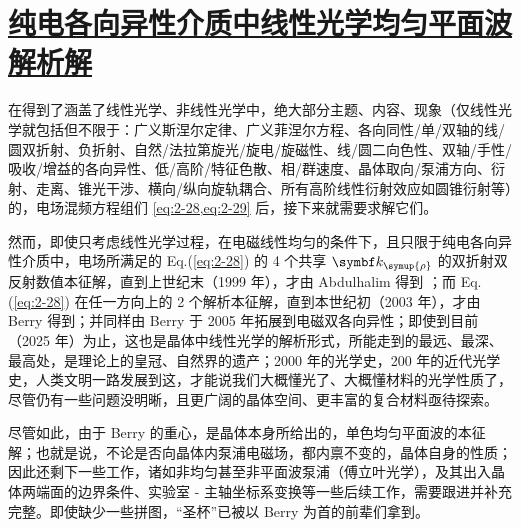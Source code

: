 \section{\protect\hyperlink{chap:\thesection}{纯电各向异性介质中线性光学均匀平面波解析解}}
\label{纯电各向异性介质中线性光学均匀平面波解析解}

在得到了涵盖了线性光学、非线性光学中，绝大部分主题、内容、现象（仅线性光学就包括但不限于：广义斯涅尔定律、广义菲涅尔方程、各向同性/单/双轴的线/圆双折射、负折射、自然/法拉第旋光/旋电/旋磁性、线/圆二向色性、双轴/手性/吸收/增益的各向异性、低/高阶/特征色散、相/群速度、晶体取向/泵浦方向、衍射、走离、锥光干涉、横向/纵向旋轨耦合、所有高阶线性衍射效应如圆锥衍射等\cite{mcleodVectorFourierOptics2014}）的，电场混频方程组们 \cref{eq:2-28,eq:2-29} 后，接下来就需要求解它们。

然而，即使只考虑线性光学过程，在电磁线性均匀的条件下，且只限于纯电各向异性介质中，电场所满足的 Eq.(\ref{eq:2-28}) 的 4 个共享 $\symbf k_{\symup{\rho}}$ 的双折射双反射数值本征解，直到上世纪末（1999 年），才由 Abdulhalim 得到 \cite{abdulhalimAnalyticFormulaeRefractive1998}；而 Eq.(\ref{eq:2-28}) 在任一方向上的 2 个解析本征解，直到本世纪初（2003 年），才由 Berry\cite{berryOpticalSingularitiesBirefringent2003} 得到；并同样由 Berry 于 2005 年拓展到电磁双各向异性\cite{berryOpticalSingularitiesBianisotropic2005}；即使到目前（2025 年）为止，这也是晶体中线性光学的解析形式，所能走到的最远、最深、最高处，是理论上的皇冠、自然界的遗产；2000 年的光学史，200 年的近代光学史，人类文明一路发展到这，才能说我们大概懂光了、大概懂材料的光学性质了，尽管仍有一些问题没明晰\cite{lakhtakiaWhenDoesChoice2007,nelsonDerivingTransmissionReflection1995}，且更广阔的晶体空间\cite{berryOpticalSingularitiesBianisotropic2005}、更丰富的复合材料\cite{mackayElectromagneticAnisotropyBianisotropy2019,mackayModernAnalyticalElectromagnetic2020}亟待探索。

尽管如此，由于 Berry 的重心，是晶体本身所给出的，单色均匀平面波的本征解；也就是说，不论是否向晶体内泵浦电磁场，都内禀不变的，晶体自身的性质；因此还剩下一些工作，诸如非均匀甚至非平面波泵浦（傅立叶光学），及其出入晶体两端面的边界条件、实验室 - 主轴坐标系变换等一些后续工作，需要跟进并补充完整。即使缺少一些拼图，“圣杯”已被以 Berry 为首的前辈们拿到\cite{olyslagerElectromagneticsExoticMedia2002}。

